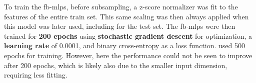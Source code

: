 To train the \glspl{fb-mlp}, before subsampling, a z-score normalizer was fit to the features of the entire train set.
This same scaling was then always applied when this model was later used, including for the test set.
The \glspl{fb-mlp} were then trained for \textbf{200 epochs} using \textbf{stochastic gradient descent} for optimization, a \textbf{learning rate} of \num{0.0001}, and binary cross-entropy as a loss function.
\Textcite{muller_coherent_2022} used 500 epochs for training.
However, here the performance could not be seen to improve after 200 epochs, which is likely also due to the smaller input dimension, requiring less fitting.
